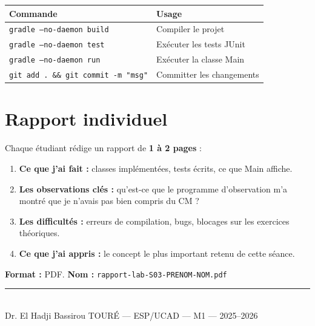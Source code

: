 \documentclass[11pt,a4paper]{article}
\begin{document}
\begin{retenirbox}
\renewcommand{\arraystretch}{1.3}
\small
\begin{tabular}{@{}l l@{}}
\toprule
\textbf{Commande} & \textbf{Usage} \\
\midrule
\texttt{gradle --no-daemon build} & Compiler le projet \\
\texttt{gradle --no-daemon test}  & Exécuter les tests JUnit \\
\texttt{gradle --no-daemon run}   & Exécuter la classe Main \\
\texttt{git add . \&\& git commit -m "msg"} & Committer les changements \\
\bottomrule
\end{tabular}
\end{retenirbox}

\section*{Rapport individuel}

\begin{attentionbox}
Chaque étudiant rédige un rapport de \textbf{1 à 2 pages} :
\begin{enumerate}[nosep]
    \item \textbf{Ce que j'ai fait :} classes implémentées, tests écrits, ce que Main affiche.
    \item \textbf{Les observations clés :} qu'est-ce que le programme d'observation m'a montré que je n'avais pas bien compris du CM ?
    \item \textbf{Les difficultés :} erreurs de compilation, bugs, blocages sur les exercices théoriques.
    \item \textbf{Ce que j'ai appris :} le concept le plus important retenu de cette séance.
\end{enumerate}
\textbf{Format :} PDF. \textbf{Nom :} \texttt{rapport-lab-S03-PRENOM-NOM.pdf}
\end{attentionbox}

\vfill
\begin{center}
\rule{0.6\textwidth}{0.4pt}\\[6pt]
{\small Dr. El Hadji Bassirou TOURÉ --- ESP/UCAD --- M1 --- 2025--2026}
\end{center}
\end{document}
